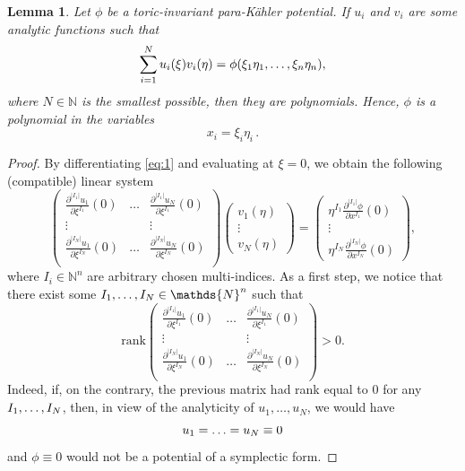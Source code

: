 \documentclass[11pt, reqno]{amsart}
\newtheorem{lem}[theor]{Lemma}
\newcommand{\de}{\partial}
\newcommand{\N}{\mathds{N}}
\newcommand{\pk }{para-K\"{a}hler }
\begin{document}
\begin{lem}\label{lem.polyn}
Let $\phi$ be a toric-invariant \pk potential.
If $u_i$ and $v_i$ are some analytic functions such that
\begin{equation}\label{eq:1}
\sum_{i=1}^N u_i(\xi)v_i(\eta)=\phi(\xi_1\eta_1,\mathellipsis,\xi_n\eta_n),\end{equation}
where  $N\in\N$ is the smallest possible,
then they are polynomials. Hence, $\phi$ is a polynomial in the variables 
\begin{equation}\label{eq.x.xi.eta}
x_i=\xi_i\eta_i\,.
\end{equation}
\end{lem}
\begin{proof}
By differentiating \eqref{eq:1} and evaluating at $\xi=0$, we obtain the following (compatible) linear system
\begin{equation}\label{system}
\begin{pmatrix}
\frac{\de^{|I_1|} u_1}{\de\xi^{I_1}}(0) &\dots&\frac{\de^{|I_1|}  u_N}{\de\xi^{I_1}}(0) \\
\vdots& &\vdots\\
\frac{\de^{|I_N|}  u_1}{\de\xi^{I_N}}(0) &\dots&\frac{\de^{|I_N|}  u_N}{\de\xi^{I_N}}(0) \\
\end{pmatrix}
\begin{pmatrix}
v_1(\eta)\\
\vdots\\
v_N(\eta)
\end{pmatrix}
=\begin{pmatrix}
\eta^{I_1}\frac{\de^{|I_1|}  \phi}{\de x^{I_1}}(0)\\
\vdots\\
\eta^{I_N}\frac{\de^{|I_N|}  \phi}{\de x^{I_N}}(0)
\end{pmatrix},
\end{equation}
where $I_i\in\N^n$ are arbitrary chosen multi-indices. As a first step, we notice that there exist some $I_1,\mathellipsis,I_N\in\N^n$ such that
$$\mathrm{rank} \begin{pmatrix}
\frac{\de^{|I_1|} u_1}{\de\xi^{I_1}}(0) &\dots&\frac{\de^{|I_1|} u_N}{\de\xi^{I_1}}(0) \\
\vdots& &\vdots\\
\frac{\de^{|I_N|} u_1}{\de\xi^{I_N}}(0) &\dots&\frac{\de^{|I_N|} u_N}{\de\xi^{I_N}}(0) \\
\end{pmatrix}>0.
$$ 
Indeed, if, on the contrary, the previous matrix had rank equal to 0 for any $I_1,\mathellipsis,I_N$, then, in view of the analyticity of $u_1,\dots,u_N$, we would have
$$u_1=\mathellipsis=u_N\equiv 0$$  and $\phi\equiv0$ would  not be a potential of a symplectic form.


\end{proof}
\end{document}
